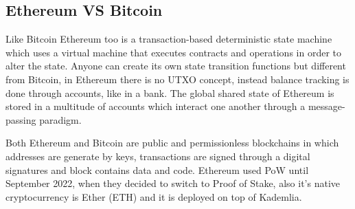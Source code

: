 \subsection{Ethereum VS Bitcoin}
Like Bitcoin Ethereum too is a transaction-based deterministic state machine which uses a virtual machine that executes contracts and operations in order to alter the state.
Anyone can create its own state transition functions but different from Bitcoin, in Ethereum there is no UTXO concept, instead balance tracking is done through accounts, like in a bank.
The global shared state of Ethereum is stored in a multitude of accounts which interact one another through a message-passing paradigm.

Both Ethereum and Bitcoin are public and permissionless blockchains in which addresses are generate by keys, transactions are signed through a digital signatures and block contains data and code.
Ethereum used PoW until September 2022, when they decided to switch to Proof of Stake, also it's native cryptocurrency is Ether (ETH) and it is deployed on top of Kademlia.


